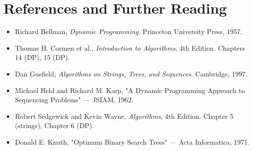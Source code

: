 \section{References and Further Reading}

\begin{itemize}
\item Richard Bellman, \textit{Dynamic Programming}. Princeton University Press, 1957.
\item Thomas H. Cormen et al., \textit{Introduction to Algorithms}, 4th Edition. Chapters 14 (DP), 15 (DP).
\item Dan Gusfield, \textit{Algorithms on Strings, Trees, and Sequences}. Cambridge, 1997.
\item Michael Held and Richard M. Karp, "A Dynamic Programming Approach to Sequencing Problems" — JSIAM, 1962.
\item Robert Sedgewick and Kevin Wayne, \textit{Algorithms}, 4th Edition. Chapter 5 (strings), Chapter 6 (DP).
\item Donald E. Knuth, "Optimum Binary Search Trees" — Acta Informatica, 1971.
\end{itemize}

